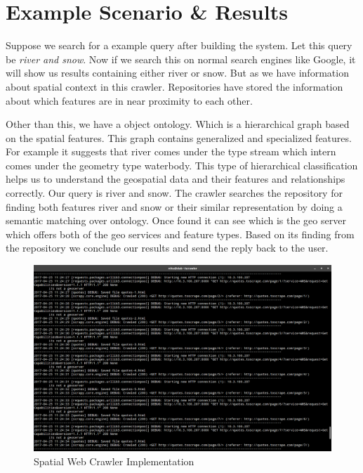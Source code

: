 \section{Example Scenario \& Results}
Suppose we search for a example query after building the system. Let this query be \textit{river and snow}. Now if we search this on normal search engines like Google, it will show us results containing either river or snow. But as we have information about spatial context in this crawler. Repositories have stored the information about which features are in near proximity to each other.
\newline
\par
Other than this, we have a object ontology. Which is a hierarchical graph based on the spatial features. This graph contains generalized and specialized features. For example it suggests that river comes under the type stream which intern comes under the geometry type waterbody. This type of hierarchical classification helps us to understand the geospatial data and their features and relationships correctly. Our query is river and snow. The crawler searches the repository for finding both features river and snow or their similar representation by doing a semantic matching over ontology. Once found it can see which is the geo server which offers both of the geo services and feature types. Based on its finding from the repository we conclude our results and send the reply back to the user.
\newline
\begin{figure}[h]
    \centering
    \includegraphics[width=\textwidth]{pix/p14}
    \caption{Spatial Web Crawler Implementation}
    \label{3.3}
\end{figure}
\newline
